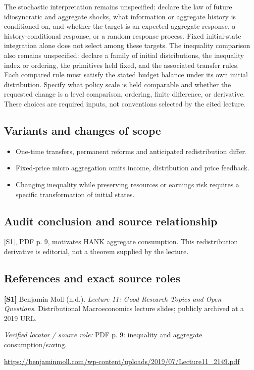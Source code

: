 \documentclass[11pt,a4paper]{article}
\begin{document}
The stochastic interpretation remains unspecified: declare the law of future idiosyncratic and aggregate shocks, what information or aggregate history is conditioned on, and whether the target is an expected aggregate response, a history-conditional response, or a random response process. Fixed initial-state integration alone does not select among these targets. The inequality comparison also remains unspecified: declare a family of initial distributions, the inequality index or ordering, the primitives held fixed, and the associated transfer rules. Each compared rule must satisfy the stated budget balance under its own initial distribution. Specify what policy scale is held comparable and whether the requested change is a level comparison, ordering, finite difference, or derivative. These choices are required inputs, not conventions selected by the cited lecture.

\subsection*{Variants and changes of scope}

\begin{itemize}
\item One-time transfers, permanent reforms and anticipated redistribution differ.
\item Fixed-price micro aggregation omits income, distribution and price feedback.
\item Changing inequality while preserving resources or earnings risk requires a specific transformation of initial states.
\end{itemize}

\subsection*{Audit conclusion and source relationship}

[S1], PDF p. 9, motivates HANK aggregate consumption. This redistribution derivative is editorial, not a theorem supplied by the lecture.

\subsection*{References and exact source roles}

{\footnotesize\raggedright
\par\noindent\textbf{[S1]} Benjamin Moll (n.d.). \emph{Lecture 11: Good Research Topics and Open Questions}. Distributional Macroeconomics lecture slides; publicly archived at a 2019 URL.\par \textit{Verified locator / source role:} PDF p. 9: inequality and aggregate consumption/saving.\par \url{https://benjaminmoll.com/wp-content/uploads/2019/07/Lecture11_2149.pdf}\par\smallskip
}
\end{document}
